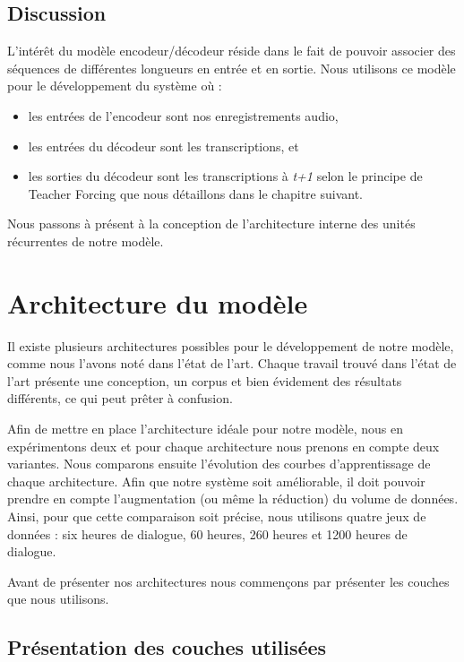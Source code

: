 \subsection{Discussion}
L'intérêt du modèle encodeur/décodeur réside dans le fait de pouvoir associer des séquences de différentes longueurs en entrée et en sortie. Nous utilisons ce modèle pour le développement du système où :
\begin{itemize}
    \item les entrées de l'encodeur sont nos enregistrements audio,
    \item les entrées du décodeur sont les transcriptions, et
    \item les sorties du décodeur sont les transcriptions à \textit{t+1} selon le principe de Teacher Forcing que nous détaillons dans le chapitre suivant. \\
\end{itemize}

Nous passons à présent à la conception de l'architecture interne des unités récurrentes de notre modèle.

\section{Architecture du modèle}
Il existe plusieurs architectures possibles pour le développement de notre modèle, comme nous l'avons noté dans l'état de l'art. Chaque travail trouvé dans l'état de l'art présente une conception, un corpus et bien évidement des résultats différents, ce qui peut prêter à confusion.

Afin de mettre en place l'architecture idéale pour notre modèle, nous en expérimentons deux et pour chaque architecture nous prenons en compte deux variantes. Nous comparons ensuite l'évolution des courbes d'apprentissage de chaque architecture. Afin que notre système soit améliorable, il doit pouvoir prendre en compte l'augmentation (ou même la réduction) du volume de données. Ainsi, pour que cette comparaison soit précise, nous utilisons quatre jeux de données : six heures de dialogue, 60 heures, 260 heures et 1200 heures de dialogue.

Avant de présenter nos architectures nous commençons par présenter les couches que nous utilisons.

\subsection{Présentation des couches utilisées}
